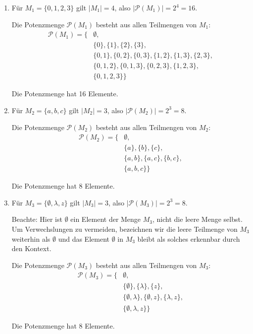 \documentclass{article}
\begin{document}
\begin{enumerate}
\item Für $M_{1} = \{0, 1, 2, 3\}$ gilt $|M_{1}| = 4$, also $|\mathcal{P}(M_{1})| = 2^4 = 16$.

Die Potenzmenge $\mathcal{P}(M_{1})$ besteht aus allen Teilmengen von $M_{1}$:
\begin{align*}
\mathcal{P}(M_{1}) = \{&\emptyset, \\
&\{0\}, \{1\}, \{2\}, \{3\}, \\
&\{0,1\}, \{0,2\}, \{0,3\}, \{1,2\}, \{1,3\}, \{2,3\}, \\
&\{0,1,2\}, \{0,1,3\}, \{0,2,3\}, \{1,2,3\}, \\
&\{0,1,2,3\}\}
\end{align*}

Die Potenzmenge hat 16 Elemente.

\item Für $M_{2} = \{a, b, c\}$ gilt $|M_{2}| = 3$, also $|\mathcal{P}(M_{2})| = 2^3 = 8$.

Die Potenzmenge $\mathcal{P}(M_{2})$ besteht aus allen Teilmengen von $M_{2}$:
\begin{align*}
\mathcal{P}(M_{2}) = \{&\emptyset, \\
&\{a\}, \{b\}, \{c\}, \\
&\{a,b\}, \{a,c\}, \{b,c\}, \\
&\{a,b,c\}\}
\end{align*}

Die Potenzmenge hat 8 Elemente.

\item Für $M_{3} = \{\emptyset, \lambda, z\}$ gilt $|M_{3}| = 3$, also $|\mathcal{P}(M_{3})| = 2^3 = 8$.

Beachte: Hier ist $\emptyset$ ein Element der Menge $M_{3}$, nicht die leere Menge selbst. Um Verwechslungen zu vermeiden, bezeichnen wir die leere Teilmenge von $M_{3}$ weiterhin als $\emptyset$ und das Element $\emptyset$ in $M_{3}$ bleibt als solches erkennbar durch den Kontext.

Die Potenzmenge $\mathcal{P}(M_{3})$ besteht aus allen Teilmengen von $M_{3}$:
\begin{align*}
\mathcal{P}(M_{3}) = \{&\emptyset, \\
&\{\emptyset\}, \{\lambda\}, \{z\}, \\
&\{\emptyset,\lambda\}, \{\emptyset,z\}, \{\lambda,z\}, \\
&\{\emptyset,\lambda,z\}\}
\end{align*}

Die Potenzmenge hat 8 Elemente.
\end{enumerate}
\end{document}
